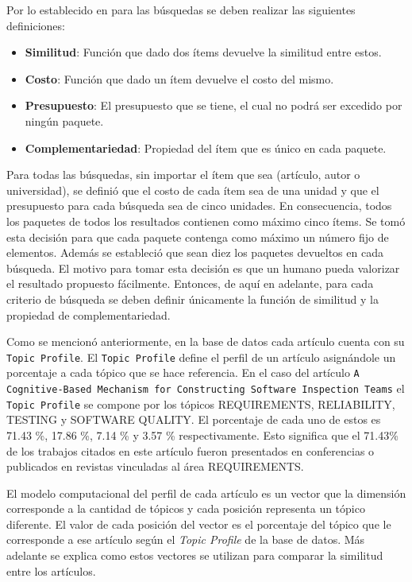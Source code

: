 Por lo establecido en \cite{compositeRetrival} para las búsquedas se deben realizar las siguientes definiciones:
\begin{itemize}
  \item \textbf{Similitud}: Función que dado dos ítems devuelve la similitud entre estos.
  \item \textbf{Costo}: Función que dado un ítem devuelve el costo del mismo.
  \item \textbf{Presupuesto}: El presupuesto que se tiene, el cual no podrá ser excedido por ningún paquete.
  \item \textbf{Complementariedad}: Propiedad del ítem que es único en cada paquete.
\end{itemize}

Para todas las búsquedas, sin importar el ítem que sea (artículo, autor o universidad), se definió que el costo de cada ítem sea de una unidad y que el presupuesto para cada búsqueda sea de cinco unidades. En consecuencia, todos los paquetes de todos los resultados contienen como máximo cinco ítems. Se tomó esta decisión para que cada paquete contenga como máximo un número fijo de elementos. Además se estableció que sean diez los paquetes devueltos en cada búsqueda. El motivo para tomar esta decisión es que un humano pueda valorizar el resultado propuesto fácilmente. Entonces, de aquí en adelante, para cada criterio de búsqueda se deben definir únicamente la función de similitud y la propiedad de complementariedad.

Como se mencionó anteriormente, en la base de datos cada artículo cuenta con su \texttt{Topic Profile}. El \texttt{Topic Profile} define el perfil de un artículo asignándole un porcentaje a cada tópico que se hace referencia. En el caso del artículo \texttt{A Cognitive-Based Mechanism for Constructing Software Inspection Teams} el \texttt{Topic Profile} se compone por los tópicos  REQUIREMENTS, RELIABILITY, TESTING y SOFTWARE QUALITY. El porcentaje de cada uno de estos es 71.43 \%, 17.86 \%, 7.14 \% y 3.57 \% respectivamente. Esto significa que el 71.43\% de los trabajos citados en este artículo fueron presentados en conferencias o publicados en revistas vinculadas al área REQUIREMENTS.

El modelo computacional del perfil de cada artículo es un vector que la dimensión corresponde a la cantidad de tópicos y cada posición representa un tópico diferente. El valor de cada posición del vector es el porcentaje del tópico que le corresponde a ese artículo según el \textit{Topic Profile} de la base de datos. Más adelante se explica como estos vectores se utilizan para comparar la similitud entre los artículos.

